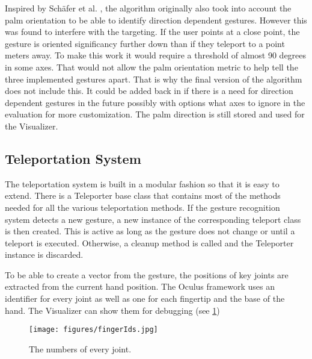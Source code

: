 Inspired by Schäfer et al. \cite{Schafer2021}, the algorithm originally also took into account the palm orientation to be able to identify direction dependent gestures. However this was found to interfere with the targeting. If the user points at a close point, the gesture is oriented significancy further down than if they teleport to a point meters away. To make this work it would require a threshold of almost 90 degrees in some axes. That would not allow the palm orientation metric to help tell the three implemented gestures apart. That is why the final version of the algorithm does not include this. It could be added back in if there is a need for direction dependent gestures in the future possibly with options what axes to ignore in the evaluation for more customization. The palm direction is still stored and used for the Visualizer.

\subsection{Teleportation System}
The teleportation system is built in a modular fashion so that it is easy to extend. There is a Teleporter base class that contains most of the methods needed for all the various teleportation methods. If the gesture recognition system detects a new gesture, a new instance of the corresponding teleport class is then created. This is active as long as the gesture does not change or until a teleport is executed. Otherwise, a cleanup method is called and the Teleporter instance is discarded. 

To be able to create a vector from the gesture, the positions of key joints are extracted from the current hand position. The Oculus framework uses an identifier for every joint as well as one for each fingertip and the base of the hand. The Visualizer can show them for debugging (see \ref{fig:fingerIds})

\begin{figure}[!ht]
    \centering
    \texttt{[image: figures/fingerIds.jpg]}
    \caption{The numbers of every joint.}
    \label{fig:fingerIds}
\end{figure}

